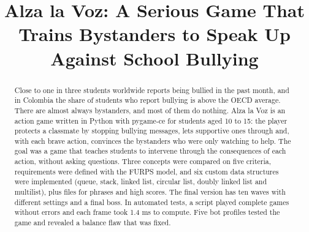 \documentclass[conference]{IEEEtran}
\begin{document}
\title{Alza la Voz: A Serious Game That Trains Bystanders to Speak Up Against School Bullying}

\author{

\and {}\and {}\and {}\and {}

\and {}}

\maketitle

\begin{abstract}Close to one in three students worldwide reports being bullied in the past month, and in Colombia the share of students who report bullying is above the OECD average. There are almost always bystanders, and most of them do nothing. Alza la Voz is an action game written in Python with pygame-ce for students aged 10 to 15: the player protects a classmate by stopping bullying messages, lets supportive ones through and, with each brave action, convinces the bystanders who were only watching to help. The goal was a game that teaches students to intervene through the consequences of each action, without asking questions. Three concepts were compared on five criteria, requirements were defined with the FURPS model, and six custom data structures were implemented (queue, stack, linked list, circular list, doubly linked list and multilist), plus files for phrases and high scores. The final version has ten waves with different settings and a final boss. In automated tests, a script played complete games without errors and each frame took 1.4 ms to compute. Five bot profiles tested the game and revealed a balance flaw that was fixed.\end{abstract}
\end{document}
